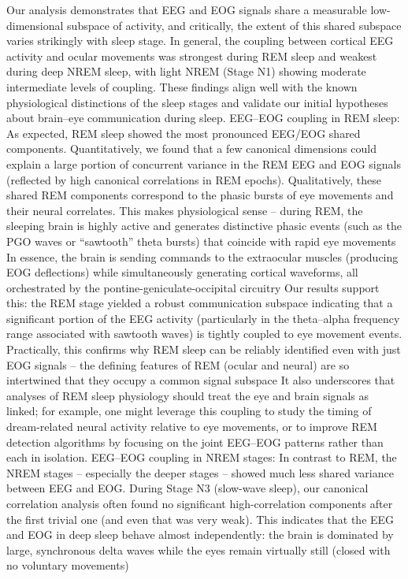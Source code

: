 Our analysis demonstrates that EEG and EOG signals share a measurable low-dimensional subspace of activity, and critically, the extent of this shared subspace varies strikingly with sleep stage. In general, the coupling between cortical EEG activity and ocular movements was strongest during REM sleep and weakest during deep NREM sleep, with light NREM (Stage N1) showing moderate intermediate levels of coupling. These findings align well with the known physiological distinctions of the sleep stages and validate our initial hypotheses about brain–eye communication during sleep. EEG–EOG coupling in REM sleep: As expected, REM sleep showed the most pronounced EEG/EOG shared components. Quantitatively, we found that a few canonical dimensions could explain a large portion of concurrent variance in the REM EEG and EOG signals (reflected by high canonical correlations in REM epochs). Qualitatively, these shared REM components correspond to the phasic bursts of eye movements and their neural correlates. This makes physiological sense – during REM, the sleeping brain is highly active and generates distinctive phasic events (such as the PGO waves or “sawtooth” theta bursts) that coincide with rapid eye movements %
In essence, the brain is sending commands to the extraocular muscles (producing EOG deflections) while simultaneously generating cortical waveforms, all orchestrated by the pontine-geniculate-occipital circuitry %
Our results support this: the REM stage yielded a robust communication subspace indicating that a significant portion of the EEG activity (particularly in the theta–alpha frequency range associated with sawtooth waves) is tightly coupled to eye movement events. Practically, this confirms why REM sleep can be reliably identified even with just EOG signals – the defining features of REM (ocular and neural) are so intertwined that they occupy a common signal subspace %
It also underscores that analyses of REM sleep physiology should treat the eye and brain signals as linked; for example, one might leverage this coupling to study the timing of dream-related neural activity relative to eye movements, or to improve REM detection algorithms by focusing on the joint EEG–EOG patterns rather than each in isolation. EEG–EOG coupling in NREM stages: In contrast to REM, the NREM stages – especially the deeper stages – showed much less shared variance between EEG and EOG. During Stage N3 (slow-wave sleep), our canonical correlation analysis often found no significant high-correlation components after the first trivial one (and even that was very weak). This indicates that the EEG and EOG in deep sleep behave almost independently: the brain is dominated by large, synchronous delta waves while the eyes remain virtually still (closed with no voluntary movements) %
